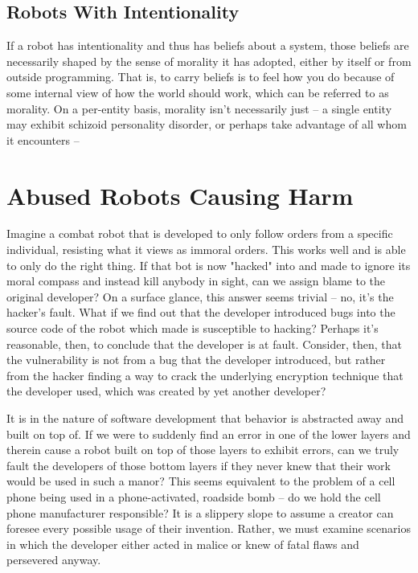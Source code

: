 \documentclass[12]{article}
\begin{document}
	\subsection{Robots With Intentionality}
		If a robot has intentionality and thus has beliefs about a system, those beliefs are necessarily shaped by the sense of morality it has adopted, either by itself or from outside programming. That is, to carry beliefs is to feel how you do because of some internal view of how the world should work, which can be referred to as morality. On a per-entity basis, morality isn't necessarily just -- a single entity may exhibit schizoid personality disorder, or perhaps take advantage of all whom it encounters -- 
			
\section{Abused Robots Causing Harm}	
	Imagine a combat robot that is developed to only follow orders from a specific individual, resisting what it views as immoral orders. This works well and is able to only do the right thing. If that bot is now "hacked" into and made to ignore its moral compass and instead kill anybody in sight, can we assign blame to the original developer? On a surface glance, this answer seems trivial -- no, it's the hacker's fault. What if we find out that the developer introduced bugs into the source code of the robot which made is susceptible to hacking? Perhaps it's reasonable, then, to conclude that the developer is at fault. Consider, then, that the vulnerability is not from a bug that the developer introduced, but rather from the hacker finding a way to crack the underlying encryption technique that the developer used, which was created by yet another developer? 
	
	It is in the nature of software development that behavior is abstracted away and built on top of. If we were to suddenly find an error in one of the lower layers and therein cause a robot built on top of those layers to exhibit errors, can we truly fault the developers of those bottom layers if they never knew that their work would be used in such a manor? This seems equivalent to the problem of a cell phone being used in a phone-activated, roadside bomb -- do we hold the cell phone manufacturer responsible? It is a slippery slope to assume a creator can foresee every possible usage of their invention. Rather, we must examine scenarios in which the developer either acted in malice or knew of fatal flaws and persevered anyway. 
\end{document}
